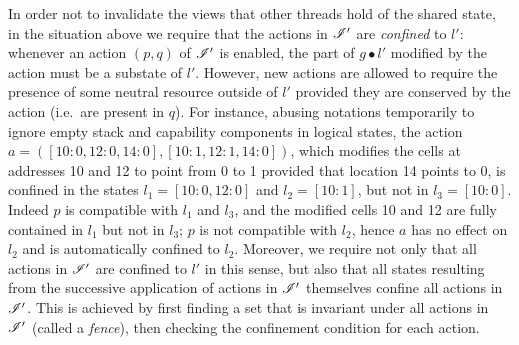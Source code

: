In order not to invalidate the views that other threads hold of the
shared state, in the situation above we require that the actions in
$\mathscr{I}'$ are \emph{confined} to $l'$: whenever an action $(p,q)$ of
$\mathscr{I}'$ is enabled, the part of $g\bullet l'$ modified by the action
must be a substate of $l'$.  However, new actions are allowed to
require the presence of some neutral resource outside of $l'$ provided
they are conserved by the action (i.e.\ are present in $q$).
%
For instance, abusing notations temporarily to ignore empty stack and
capability components in logical states, the action $a = ([10:0, 12:0,
  14:0],[10:1, 12:1, 14:0])$, which modifies the cells at addresses 10
and 12 to point from 0 to 1 provided that location 14 points to 0, is
confined in the states $l_1=[10:0,12:0]$ and $l_2=[10:1]$, but not in
$l_3=[10:0]$. Indeed $p$ is compatible with $l_1$ and $l_3$, and the
modified cells 10 and 12 are fully contained in $l_1$ but not in
$l_3$; $p$ is not compatible with $l_2$, hence $a$ has no effect on
$l_2$ and is automatically confined to $l_2$.
%
Moreover, we require not only that all actions in $\mathscr{I}'$
are confined to $l'$ in this sense, but also that all states resulting
from the successive application of actions in $\mathscr{I}'$ themselves confine
all actions in $\mathscr{I}'$. This is achieved by first finding a set that
is invariant under all actions in $\mathscr{I}'$ (called a \emph{fence}),
then checking the confinement condition for each action.


